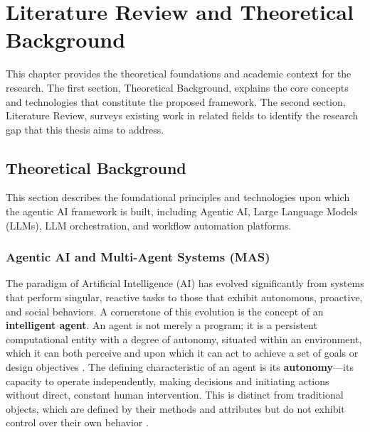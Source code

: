 \chapter{Literature Review and Theoretical Background}


This chapter provides the theoretical foundations and academic context for the research. The first section, Theoretical Background, explains the core concepts and technologies that constitute the proposed framework. The second section, Literature Review, surveys existing work in related fields to identify the research gap that this thesis aims to address.

\section{Theoretical Background}
\label{sec:theoretical_background}

This section describes the foundational principles and technologies upon which the agentic AI framework is built, including Agentic AI, Large Language Models (LLMs), LLM orchestration, and workflow automation platforms.

\subsection{Agentic AI and Multi-Agent Systems (MAS)}
\label{subsec:agentic_ai}

The paradigm of Artificial Intelligence (AI) has evolved significantly from systems that perform singular, reactive tasks to those that exhibit autonomous, proactive, and social behaviors. A cornerstone of this evolution is the concept of an \textbf{intelligent agent}. An agent is not merely a program; it is a persistent computational entity with a degree of autonomy, situated within an environment, which it can both perceive and upon which it can act to achieve a set of goals or design objectives \cite{FIND_CITATION_PLEASE}. The defining characteristic of an agent is its \textbf{autonomy}—its capacity to operate independently, making decisions and initiating actions without direct, constant human intervention. This is distinct from traditional objects, which are defined by their methods and attributes but do not exhibit control over their own behavior \cite{FIND_CITATION_PLEASE}.

